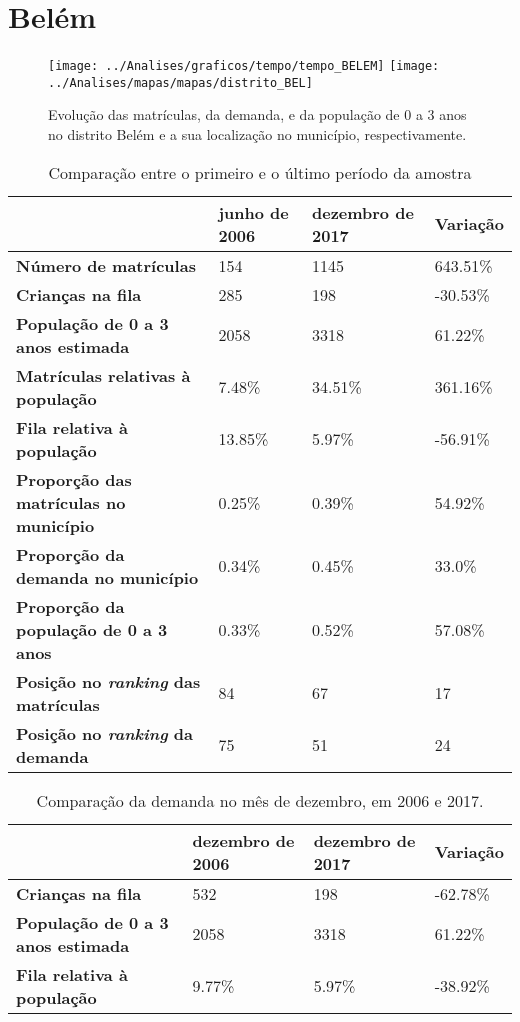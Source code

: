 \section{Belém}
\begin{figure}[H]
\centering
\texttt{[image: ../Analises/graficos/tempo/tempo\_BELEM]}
\texttt{[image: ../Analises/mapas/mapas/distrito\_BEL]}
\caption{Evolução das matrículas, da demanda, e da população de 0 a 3 anos no distrito Belém e a sua localização no município, respectivamente.}
\end{figure}
\begin{table}[H]
\begin{tabular}{l|l|l|l}
\textbf{}                                      & \textbf{junho de 2006}       & \textbf{dezembro de 2017}    & \textbf{Variação} \\ \hline
\textbf{Número de matrículas}                  & 154 & 1145 & 643.51\% \\ \hline
\textbf{Crianças na fila}                      & 285 & 198 & -30.53\% \\ \hline
\textbf{População de 0 a 3 anos estimada}      & 2058 & 3318 & 61.22\% \\ \hline
\textbf{Matrículas relativas à população}      & 7.48\% & 34.51\% & 361.16\% \\ \hline
\textbf{Fila relativa à população}             & 13.85\% & 5.97\% & -56.91\% \\ \hline
\textbf{Proporção das matrículas no município} & 0.25\% & 0.39\% & 54.92\% \\ \hline
\textbf{Proporção da demanda no município}     & 0.34\% & 0.45\% & 33.0\% \\ \hline
\textbf{Proporção da população de 0 a 3 anos}  & 0.33\% & 0.52\% & 57.08\% \\ \hline
\textbf{Posição no \textit{ranking} das matrículas}     & 84 & 67 & 17 \\ \hline
\textbf{Posição no \textit{ranking} da demanda}         & 75 & 51 & 24 \\ 
\end{tabular}
\caption{Comparação entre o primeiro e o último período da amostra}
\end{table}
\begin{table}[H]
\begin{tabular}{l|l|l|l}
\textbf{}                                 & \textbf{dezembro de 2006} & \textbf{dezembro de 2017} & \textbf{Variação} \\ \hline
\textbf{Crianças na fila}                      & 532 & 198 & -62.78\% \\ \hline
\textbf{População de 0 a 3 anos estimada}      & 2058 & 3318 & 61.22\% \\ \hline
\textbf{Fila relativa à população}             & 9.77\% & 5.97\% & -38.92\% \\
\end{tabular}
\caption{Comparação da demanda no mês de dezembro, em 2006 e 2017.}
\end{table}
